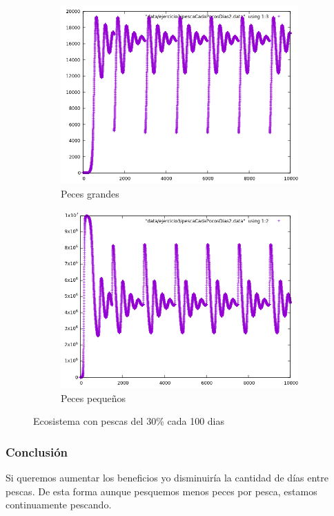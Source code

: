 \documentclass[12pt,a4paper]{article}
\begin{document}
\begin{figure}[H]
	\centering
	\begin{subfigure}{.5\textwidth}
		\centering
		\includegraphics[width=1\linewidth]{./images/pescaMasivaGrandes.png}
		\caption{Peces grandes}
		\label{fig:subPecesGrandes5}
	\end{subfigure}%
	\begin{subfigure}{.5\textwidth}
		\centering
		\includegraphics[width=1\linewidth]{./images/pescaMasivapeque.png}
		\caption{Peces pequeños}
		\label{fig:subPecesPeque5}
	\end{subfigure}
	\caption{Ecosistema con pescas del 30\% cada 100 dias}
	\label{fig:ecosistema5}
\end{figure} 
\subsubsection{Conclusión}
Si queremos aumentar los beneficios yo disminuiría la cantidad de días entre pescas. De esta forma aunque pesquemos menos peces por pesca, estamos continuamente pescando. 
\end{document}
